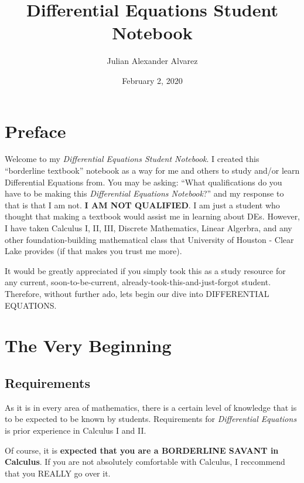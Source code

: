 \documentclass[letter, 11pt]{book}
\begin{document}
\title{\Large{\textbf{Differential Equations Student Notebook}}}
\author{Julian Alexander Alvarez}
\date{February 2, 2020}
\maketitle
\let\cleardoublepage\clearpage
\tableofcontents

\setcounter{page}{2}
\fancyhf{}
\renewcommand{\headrulewidth}{2pt}
\renewcommand{\footrulewidth}{1pt}

\fancyhead[LE]{\leftmark}
\fancyhead[RO]{\leftmark}
\fancyfoot[LE,RO]{\thepage}

\chapter{Preface}
Welcome to my \textit{Differential Equations Student Notebook}. I created this ``borderline textbook'' notebook
as a way for me and others to study and/or learn Differential Equations from. You may be asking: ``What qualifications do you have to be making this \textit{Differential Equations Notebook}?''
and my response to that is that I am not. \textbf{I AM NOT QUALIFIED}. I am just a student who thought that making a textbook would assist me in learning about DEs. However, I have taken Calculus I, II, III, Discrete Mathematics, Linear Algerbra, and any other foundation-building mathematical class that University of Houston - Clear Lake provides (if that makes you trust me more).


It would be greatly appreciated if you simply took this as a study resource for any current, soon-to-be-current, already-took-this-and-just-forgot student.
Therefore, without further ado, lets begin our dive into DIFFERENTIAL EQUATIONS.
\newpage
\chapter{The Very Beginning}
\section{Requirements}
As it is in every area of mathematics, there is a certain level of knowledge that is to be expected to be known by students.
Requirements for \textit{Differential Equations} is prior experience in Calculus I and II.

Of course, it is \textbf{expected that you are a BORDERLINE SAVANT in Calculus}. If you are not absolutely comfortable with Calculus, I reccommend that you REALLY go over it.
\end{document}
